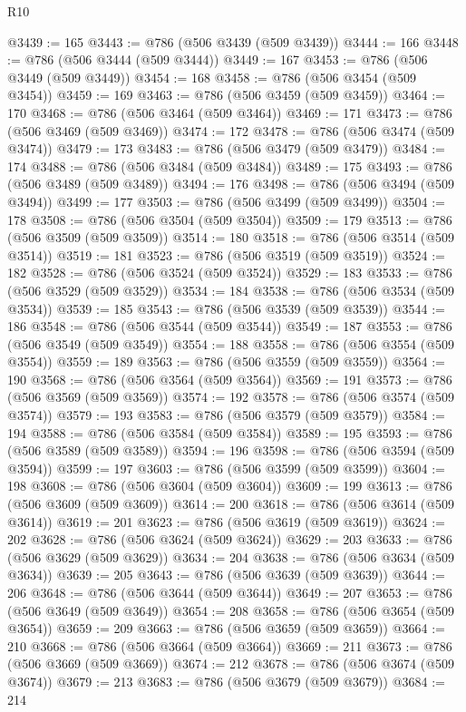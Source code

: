 \begin{lexlean}{R10}
\begin{coremodule}
@3439 := 165
@3443 := @786 (@506 @3439 (@509 @3439))
@3444 := 166
@3448 := @786 (@506 @3444 (@509 @3444))
@3449 := 167
@3453 := @786 (@506 @3449 (@509 @3449))
@3454 := 168
@3458 := @786 (@506 @3454 (@509 @3454))
@3459 := 169
@3463 := @786 (@506 @3459 (@509 @3459))
@3464 := 170
@3468 := @786 (@506 @3464 (@509 @3464))
@3469 := 171
@3473 := @786 (@506 @3469 (@509 @3469))
@3474 := 172
@3478 := @786 (@506 @3474 (@509 @3474))
@3479 := 173
@3483 := @786 (@506 @3479 (@509 @3479))
@3484 := 174
@3488 := @786 (@506 @3484 (@509 @3484))
@3489 := 175
@3493 := @786 (@506 @3489 (@509 @3489))
@3494 := 176
@3498 := @786 (@506 @3494 (@509 @3494))
@3499 := 177
@3503 := @786 (@506 @3499 (@509 @3499))
@3504 := 178
@3508 := @786 (@506 @3504 (@509 @3504))
@3509 := 179
@3513 := @786 (@506 @3509 (@509 @3509))
@3514 := 180
@3518 := @786 (@506 @3514 (@509 @3514))
@3519 := 181
@3523 := @786 (@506 @3519 (@509 @3519))
@3524 := 182
@3528 := @786 (@506 @3524 (@509 @3524))
@3529 := 183
@3533 := @786 (@506 @3529 (@509 @3529))
@3534 := 184
@3538 := @786 (@506 @3534 (@509 @3534))
@3539 := 185
@3543 := @786 (@506 @3539 (@509 @3539))
@3544 := 186
@3548 := @786 (@506 @3544 (@509 @3544))
@3549 := 187
@3553 := @786 (@506 @3549 (@509 @3549))
@3554 := 188
@3558 := @786 (@506 @3554 (@509 @3554))
@3559 := 189
@3563 := @786 (@506 @3559 (@509 @3559))
@3564 := 190
@3568 := @786 (@506 @3564 (@509 @3564))
@3569 := 191
@3573 := @786 (@506 @3569 (@509 @3569))
@3574 := 192
@3578 := @786 (@506 @3574 (@509 @3574))
@3579 := 193
@3583 := @786 (@506 @3579 (@509 @3579))
@3584 := 194
@3588 := @786 (@506 @3584 (@509 @3584))
@3589 := 195
@3593 := @786 (@506 @3589 (@509 @3589))
@3594 := 196
@3598 := @786 (@506 @3594 (@509 @3594))
@3599 := 197
@3603 := @786 (@506 @3599 (@509 @3599))
@3604 := 198
@3608 := @786 (@506 @3604 (@509 @3604))
@3609 := 199
@3613 := @786 (@506 @3609 (@509 @3609))
@3614 := 200
@3618 := @786 (@506 @3614 (@509 @3614))
@3619 := 201
@3623 := @786 (@506 @3619 (@509 @3619))
@3624 := 202
@3628 := @786 (@506 @3624 (@509 @3624))
@3629 := 203
@3633 := @786 (@506 @3629 (@509 @3629))
@3634 := 204
@3638 := @786 (@506 @3634 (@509 @3634))
@3639 := 205
@3643 := @786 (@506 @3639 (@509 @3639))
@3644 := 206
@3648 := @786 (@506 @3644 (@509 @3644))
@3649 := 207
@3653 := @786 (@506 @3649 (@509 @3649))
@3654 := 208
@3658 := @786 (@506 @3654 (@509 @3654))
@3659 := 209
@3663 := @786 (@506 @3659 (@509 @3659))
@3664 := 210
@3668 := @786 (@506 @3664 (@509 @3664))
@3669 := 211
@3673 := @786 (@506 @3669 (@509 @3669))
@3674 := 212
@3678 := @786 (@506 @3674 (@509 @3674))
@3679 := 213
@3683 := @786 (@506 @3679 (@509 @3679))
@3684 := 214

\end{coremodule}
\end{lexlean}
